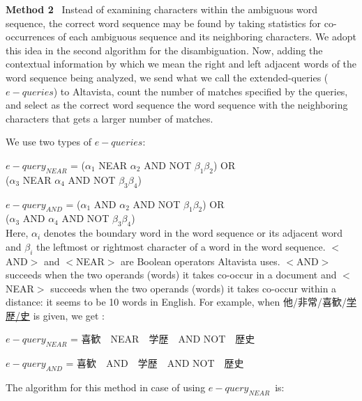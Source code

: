 \vspace{10pt}

{\bf Method 2}~ Instead of examining characters within the ambiguous word
sequence, the correct word sequence may be found by taking statistics
for co-occurrences of each ambiguous sequence and its neighboring
characters. We adopt this idea in the second algorithm for the
disambiguation. Now, adding the contextual information by which we
mean the right and left adjacent words of the word sequence being
analyzed, we send what we call the extended-queries (${e-queries}$) to
Altavista, count the number of matches specified by the queries,
and select as the correct word sequence the word sequence with the
neighboring characters that gets a larger number of matches. 

We use two types of ${e-queries}$:

\hspace*{3zw}${e-query}_{NEAR}$  = ($\alpha_{1}$ NEAR $\alpha_{2}$ AND NOT $\beta_{1}$$\beta_{2}$) OR\\
\hspace*{13zw}($\alpha_{3}$ NEAR $\alpha_{4}$ AND NOT $\beta_{3}$$\beta_{4}$)

\hspace*{3zw}${e-query}_{AND}$  = ($\alpha_{1}$ AND $\alpha_{2}$ AND NOT $\beta_{1}$$\beta_{2}$) OR\\
\hspace*{12.5zw}($\alpha_{3}$ AND $\alpha_{4}$ AND NOT $\beta_{3}$$\beta_{4}$)\\
Here, $\alpha_{i}$  denotes the boundary word in the word sequence or its adjacent
word and $\beta_{i}$ the leftmost or rightmost character of a word in the word
sequence. $<$AND$>$ and $<$NEAR$>$ are Boolean operators Altavista uses.
$<$AND$>$ succeeds when the two operands (words) it takes co-occur in a
document and $<$NEAR$>$ succeeds when the two operands (words) it takes
co-occur within a distance: it seems to be 10 words in English.
For example, when {\small 他/非常/喜歓/\underline{学歴/史}} is given, we get :

\hspace*{3zw}${e-query}_{NEAR}$ = {\small 喜歓}　NEAR　{\small 学歴}　AND NOT　{\small 歴史}

\hspace*{3zw}${e-query}_{AND}$ = {\small 喜歓}　AND　{\small 学歴}　AND NOT　{\small 歴史}

\hspace*{-15pt}The algorithm for this method in case of using ${e-query}_{NEAR}$~is:

